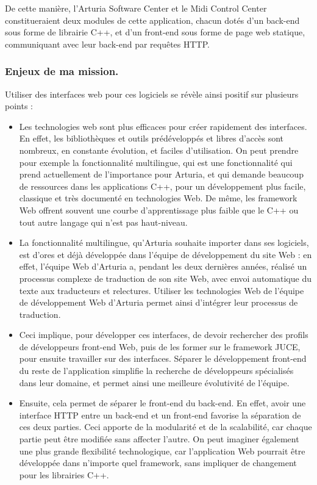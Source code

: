 \documentclass[francais]{rapportPFE}  %
\begin{document}
De cette manière, l'Arturia Software Center et le Midi Control Center constitueraient deux modules de cette application, chacun dotés d'un back-end sous forme de librairie C++, et d'un front-end sous forme de page web statique, communiquant avec leur back-end par requêtes HTTP.\\

\subsubsection{Enjeux de ma mission.}

Utiliser des interfaces web pour ces logiciels se révèle ainsi positif sur plusieurs points : 
\begin{itemize}
	\item Les technologies web sont plus efficaces pour créer rapidement des interfaces. En effet, les bibliothèques et outils prédéveloppés et libres d'accès sont nombreux, en constante évolution, et faciles d'utilisation. On peut prendre pour exemple la fonctionnalité multilingue, qui est une fonctionnalité qui prend actuellement de l'importance pour Arturia, et qui demande beaucoup de ressources dans les applications C++, pour un développement plus facile, classique et très documenté en technologies Web. De même, les framework Web offrent souvent une courbe d'apprentissage plus faible que le C++ ou tout autre langage qui n'est pas haut-niveau.
	\item La fonctionnalité multilingue, qu'Arturia souhaite importer dans ses logiciels, est d'ores et déjà développée dans l'équipe de développement du site Web : en effet, l'équipe Web d'Arturia a, pendant les deux dernières années, réalisé un processus complexe de traduction de son site Web, avec envoi automatique du texte aux traducteurs et relectures. Utiliser les technologies Web de l'équipe de développement Web d'Arturia permet ainsi d'intégrer leur processus de traduction.
	\item Ceci implique, pour développer ces interfaces, de devoir rechercher des profils de développeurs front-end Web, puis de les former sur le framework JUCE, pour ensuite travailler sur des interfaces. Séparer le développement front-end du reste de l'application simplifie la recherche de développeurs spécialisés dans leur domaine, et permet ainsi une meilleure évolutivité de l'équipe.
	\item Ensuite, cela permet de séparer le front-end du back-end. En effet, avoir une interface HTTP entre un back-end et un front-end favorise la séparation de ces deux parties. Ceci apporte de la modularité et de la scalabilité, car chaque partie peut être modifiée sans affecter l'autre. On peut imaginer également une plus grande flexibilité technologique, car l'application Web pourrait être développée dans n'importe quel framework, sans impliquer de changement pour les librairies C++.
\end{itemize}
\end{document}
